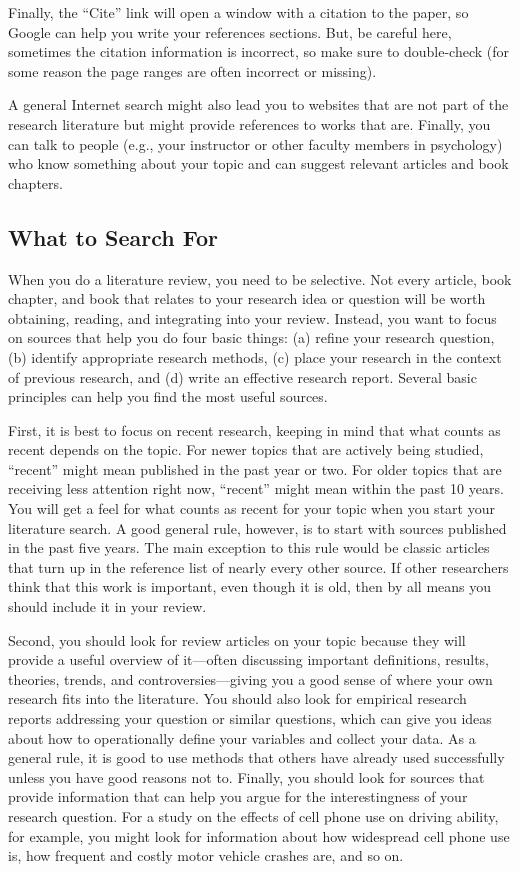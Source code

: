 \documentclass[]{book}
\theoremstyle{definition}
\theoremstyle{definition}
\theoremstyle{remark}
\begin{document}
Finally, the ``Cite'' link will open a window with a citation to the
paper, so Google can help you write your references sections. But, be
careful here, sometimes the citation information is incorrect, so make
sure to double-check (for some reason the page ranges are often
incorrect or missing).

A general Internet search might also lead you to websites that are not
part of the research literature but might provide references to works
that are. Finally, you can talk to people (e.g., your instructor or
other faculty members in psychology) who know something about your topic
and can suggest relevant articles and book chapters.

\subsection{What to Search For}\label{what-to-search-for}

When you do a literature review, you need to be selective. Not every
article, book chapter, and book that relates to your research idea or
question will be worth obtaining, reading, and integrating into your
review. Instead, you want to focus on sources that help you do four
basic things: (a) refine your research question, (b) identify
appropriate research methods, (c) place your research in the context of
previous research, and (d) write an effective research report. Several
basic principles can help you find the most useful sources.

First, it is best to focus on recent research, keeping in mind that what
counts as recent depends on the topic. For newer topics that are
actively being studied, ``recent'' might mean published in the past year
or two. For older topics that are receiving less attention right now,
``recent'' might mean within the past 10 years. You will get a feel for
what counts as recent for your topic when you start your literature
search. A good general rule, however, is to start with sources published
in the past five years. The main exception to this rule would be classic
articles that turn up in the reference list of nearly every other
source. If other researchers think that this work is important, even
though it is old, then by all means you should include it in your
review.

Second, you should look for review articles on your topic because they
will provide a useful overview of it---often discussing important
definitions, results, theories, trends, and controversies---giving you a
good sense of where your own research fits into the literature. You
should also look for empirical research reports addressing your question
or similar questions, which can give you ideas about how to
operationally define your variables and collect your data. As a general
rule, it is good to use methods that others have already used
successfully unless you have good reasons not to. Finally, you should
look for sources that provide information that can help you argue for
the interestingness of your research question. For a study on the
effects of cell phone use on driving ability, for example, you might
look for information about how widespread cell phone use is, how
frequent and costly motor vehicle crashes are, and so on.
\end{document}
